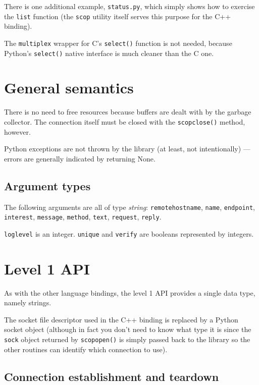 \documentclass[12pt,a4paper,twoside]{article}
\renewcommand{\_}{\texttt{\symbol{95}}}
\begin{document}
There is one additional example, \texttt{status.py}, which simply shows how
to exercise the \texttt{list} function (the \texttt{scop} utility itself
serves this purpose for the C++ binding).

The \texttt{multiplex} wrapper for C's \texttt{select()} function
is not needed, because Python's \texttt{select()} native interface is
much cleaner than the C one.

\section{General semantics}

There is no need to free resources because buffers
are dealt with by the garbage collector. The connection itself
must be closed with the \texttt{scop\_close()} method, however.

Python exceptions are not thrown by the library (at least, not
intentionally) --- errors are generally indicated by returning None.

\subsection{Argument types}

The following arguments are all of type \textit{string}:
\texttt{remote\_hostname},
\texttt{name},
\texttt{endpoint},
\texttt{interest},
\texttt{message},
\texttt{method},
\texttt{text},
\texttt{request},
\texttt{reply}.

\texttt{log\_level} is an integer.
\texttt{unique} and \texttt{verify} are booleans represented
by integers.

\section{Level 1 API}

As with the other language bindings, the level 1 API provides
a single data type, namely strings.

The socket file descriptor used in the C++ binding is replaced by a
Python socket object (although in fact you don't need to know what type
it is since the \texttt{sock} object returned by \texttt{scop\_open()}
is simply passed back to the library so the other routines can identify
which connection to use).

\subsection{Connection establishment and teardown}
\end{document}
